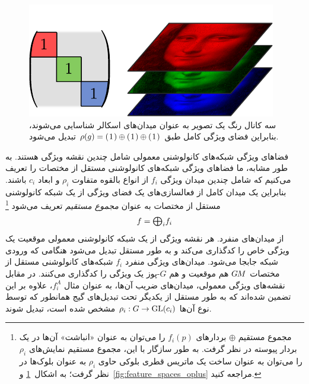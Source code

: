 \begin{figure}
	\vspace*{-4.25ex}
	\hfill
	\includegraphics[width=.95\linewidth]{figures/feature_field_RGB.pdf}%
	\vspace*{.0ex}
	\captionsetup{width=.35\textwidth}
	\caption{\small
						سه کانال رنگ یک تصویر  به عنوان میدان‌های اسکالر شناسایی می‌شوند، بنابراین فضای ویژگی کامل طبق $\rho(g) = (\mkern1.5mu 1 \mkern1.5mu) \oplus (\mkern1.5mu 1 \mkern1.5mu) \oplus (\mkern1.5mu 1 \mkern1.5mu)$ تبدیل می‌شود.
					}
					\label{fig:feature_space_RGB}
				\end{figure}%
				فضاهای ویژگی شبکه‌های کانولوشنی معمولی شامل چندین نقشه ویژگی هستند.
				به طور مشابه، ما فضاهای ویژگی شبکه‌های کانولوشنی مستقل از مختصات را تعریف می‌کنیم که شامل چندین میدان ویژگی $f_i$ از انواع بالقوه متفاوت $\rho_i$ و ابعاد $c_i$ باشند.
				بنابراین یک میدان کامل از فعالسازی‌های یک فضای ویژگی از یک شبکه کانولوشنی مستقل از مختصات به عنوان \emph{مجموع مستقیم} تعریف می‌شود%
				\footnote{
					مجموع مستقیم $\oplus$ بردارهای $f_i(p)$ را می‌توان به عنوان «انباشت» آن‌ها در یک بردار پیوسته در نظر گرفت.
					به طور سازگار با این، مجموع مستقیم نمایش‌های $\rho_i$ را می‌توان به عنوان ساخت یک ماتریس قطری بلوکی حاوی $\rho_i$ به عنوان بلوک‌ها در نظر گرفت؛ به اشکال~\ref{fig:feature_space_RGB} و~\ref{fig:feature_spaces_oplus} مراجعه کنید.
				}
				\begin{align}\label{eq:feature_field_full}
					f = \scalebox{1.1}{$\bigoplus$}_i f_i
				\end{align}
				از میدان‌های منفرد.
				هر نقشه ویژگی از یک شبکه کانولوشنی معمولی موقعیت یک ویژگی خاص را کدگذاری می‌کند و به طور مستقل تبدیل می‌شود هنگامی که ورودی شبکه جابجا می‌شود.
				میدان‌های ویژگی منفرد $f_i$ شبکه‌های کانولوشنی مستقل از مختصات $G\mkern-1.4muM$ هم موقعیت و هم $G$-پوز یک ویژگی را کدگذاری می‌کنند.
				در مقابل نقشه‌های ویژگی معمولی، میدان‌های ضریب آن‌ها، به عنوان مثال $f_i^A$، علاوه بر این تضمین شده‌اند که به طور مستقل از یکدیگر تحت تبدیل‌های گیج همانطور که توسط نوع آن‌ها ${\rho_i:G\to\operatorname{GL}({c_i})}$ مشخص شده است، تبدیل شوند.
